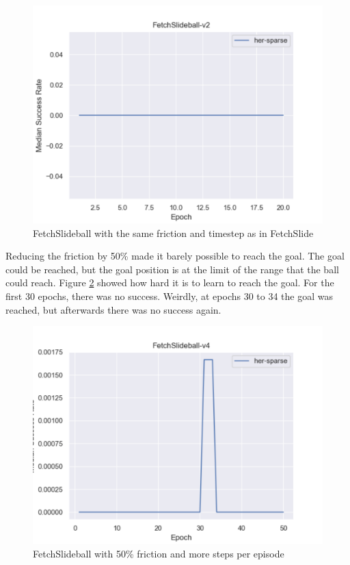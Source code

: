 \begin{figure} [h]
	
	\centering
	\includegraphics[width=1\textwidth]{figures/fig_FetchSlideball-v2.pdf}
	\caption{FetchSlideball with the same friction and timestep as in FetchSlide}
	\label{slideball2}
\end{figure}

Reducing the friction by 50\% made it barely possible to reach the goal. The goal could be reached, but the goal position is at the limit of the range that the ball could reach. Figure \ref{slideball3} showed how hard it is to learn to reach the goal. For the first 30 epochs, there was no success. Weirdly, at epochs 30 to 34 the goal was reached, but afterwards there was no success again. 

\begin{figure} [h]
	
	\centering
	\includegraphics[width=1\textwidth]{figures/fig_FetchSlideball-v4.pdf}
	\caption{FetchSlideball with 50\% friction and more steps per episode}
	\label{slideball3}
\end{figure}

